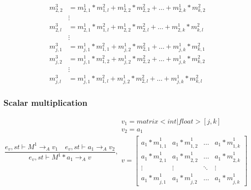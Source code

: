 \begin{minipage}{1.0\textwidth}
\begin{equation*}
\begin{aligned}
{ { m }_{ 2,2 }^{ 3 } }  &= { { m }_{ 2,1 }^{ 1 } } *{ { m }_{ 1,l }^{ 2 } }+ { { m }_{ 2,2 }^{ 1 } } *{ { m }_{ 2,2 }^{ 2 } }+\dots+ { { m }_{ 2,k }^{ 1 } } *{ { m }_{ k,2 }^{ 2 } }\\
&\vdots\\
{ { m }_{ 2,l }^{ 3 } }  &= { { m }_{ 2,1 }^{ 1 } } *{ { m }_{ 1,l }^{ 2 } }+ { { m }_{ 2,2 }^{ 1 } } *{ { m }_{ 2,l }^{ 2 } }+\dots+ { { m }_{ 2,k }^{ 1 } } *{ { m }_{ k,l }^{ 2 } }\\
&\vdots\\
{ { m }_{ j,1 }^{ 3 } }  &= { { m }_{ j,1 }^{ 1 } } *{ { m }_{ 1,1 }^{ 2 } }+ { { m }_{ j,2 }^{ 1 } } *{ { m }_{ 2,1 }^{ 2 } }+\dots+ { { m }_{ j,k }^{ 1 } } *{ { m }_{ k,1 }^{ 2 } }\\
{ { m }_{ j,2 }^{ 3 } }  &= { { m }_{ j,1 }^{ 1 } } *{ { m }_{ 1,2 }^{ 2 } }+ { { m }_{ j,2 }^{ 1 } } *{ { m }_{ 2,2 }^{ 2 } }+\dots+ { { m }_{ j,k }^{ 1 } } *{ { m }_{ k,2 }^{ 2 } }\\
&\vdots\\
{ { m }_{ j,l }^{ 3 } }  &= { { m }_{ j,1 }^{ 1 } } *{ { m }_{ 1,l }^{ 2 } }+ { { m }_{ j,2 }^{ 1 } } *{ { m }_{ 2,l }^{ 2 } }+\dots+ { { m }_{ j,k }^{ 1 } } *{ { m }_{ k,l }^{ 2 } }
\end{aligned}
\end{equation*}
\end{minipage}

\subsubsection{Scalar multiplication}
\begin{equation}
	\frac { { e }_{ v },st\vdash { M }^{ 1 }{ \rightarrow  }_{ A }{ v }_{ 1 }\quad { e }_{ v },st\vdash { a }_{ 1 }{ \rightarrow  }_{ A }{ v }_{ 2 } }{ { e }_{ v },st\vdash { M }^{ 1 }\ast { a }_{ 1 }{ \rightarrow  }_{ A }{ v } } ,\begin{matrix} { v }_{ 1 }=matrix<int|float>[j,k] \\ { v }_{ 2 }={ a }_{ 1 } \\ v=\begin{bmatrix} { { a }_{ 1 }*m }_{ 1,1 }^{ 1 } & { { a }_{ 1 }*m }_{ 1,2 }^{ 1 } & \dots  & { { a }_{ 1 }*m }_{ 1,k }^{ 1 } \\
 { { a }_{ 1 }*m }_{ 2,1 }^{ 1 } & { { a }_{ 1 }*m }_{ 2,2 }^{ 1 } & \dots  & { { a }_{ 1 }*m }_{ 2,k }^{ 1 }  \\ \vdots & \vdots & \ddots & \vdots \\ { { a }_{ 1 }*m }_{ j,1 }^{ 1 } & { { a }_{ 1 }*m }_{ j,2 }^{ 1 } & \dots & { { a }_{ 1 }*m }_{ j,k }^{ 1 } \end{bmatrix} \end{matrix}
\end{equation}

